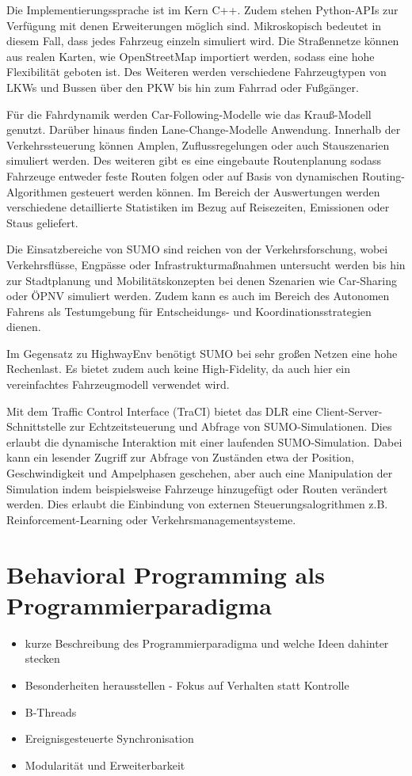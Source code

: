 Die Implementierungssprache ist im Kern C++. Zudem stehen Python-APIs zur Verfügung mit denen Erweiterungen möglich sind. Mikroskopisch bedeutet in diesem Fall, dass jedes Fahrzeug einzeln simuliert wird. Die Straßennetze können aus realen Karten, wie OpenStreetMap importiert werden, sodass eine hohe Flexibilität geboten ist. Des Weiteren werden verschiedene Fahrzeugtypen von LKWs und Bussen über den PKW bis hin zum Fahrrad oder Fußgänger.

Für die Fahrdynamik werden Car-Following-Modelle wie das Krauß-Modell genutzt. Darüber hinaus finden Lane-Change-Modelle Anwendung. Innerhalb der Verkehrssteuerung können Amplen, Zuflussregelungen oder auch Stauszenarien simuliert werden. Des weiteren gibt es eine eingebaute Routenplanung sodass Fahrzeuge entweder feste Routen folgen oder auf Basis von dynamischen Routing-Algorithmen gesteuert werden können. Im Bereich der Auswertungen werden verschiedene detaillierte Statistiken im Bezug auf Reisezeiten, Emissionen oder Staus geliefert.

Die Einsatzbereiche von SUMO sind reichen von der Verkehrsforschung, wobei Verkehrsflüsse, Engpässe oder Infrastrukturmaßnahmen untersucht werden bis hin zur Stadtplanung und Mobilitätskonzepten bei denen Szenarien wie Car-Sharing oder ÖPNV simuliert werden. Zudem kann es auch im Bereich des Autonomen Fahrens als Testumgebung für Entscheidungs- und Koordinationsstrategien dienen.

Im Gegensatz zu HighwayEnv benötigt SUMO bei sehr großen Netzen eine hohe Rechenlast. Es bietet zudem auch keine High-Fidelity, da auch hier ein vereinfachtes Fahrzeugmodell verwendet wird.

Mit dem Traffic Control Interface (TraCI) bietet das DLR eine Client-Server-Schnittstelle zur Echtzeitsteuerung und Abfrage von SUMO-Simulationen. Dies erlaubt die dynamische Interaktion mit einer laufenden SUMO-Simulation. Dabei kann ein lesender Zugriff zur Abfrage von Zuständen etwa der Position, Geschwindigkeit und Ampelphasen geschehen, aber auch eine Manipulation der Simulation indem beispielsweise Fahrzeuge hinzugefügt oder Routen verändert werden. Dies erlaubt die Einbindung von externen Steuerungsalogrithmen z.B. Reinforcement-Learning oder Verkehrsmanagementsysteme.

\section{Behavioral Programming als Programmierparadigma}
\begin{itemize}
    \item kurze Beschreibung des Programmierparadigma und welche Ideen dahinter stecken
    \item Besonderheiten herausstellen - Fokus auf Verhalten statt Kontrolle
    \item B-Threads
    \item Ereignisgesteuerte Synchronisation
    \item Modularität und Erweiterbarkeit
\end{itemize}